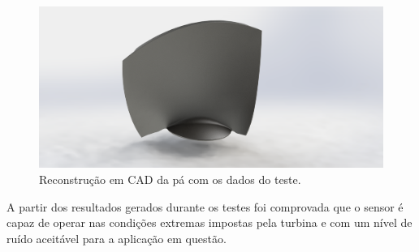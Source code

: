 \begin{figure}[h!]
\centering
	\includegraphics[width=0.9\columnwidth]{figs/3dsensors/Pa_Real_Render_04}
	\caption{Reconstrução em CAD da pá com os dados do teste.}
	\label{fig::turbina_cad}
\end{figure}

A partir dos resultados gerados durante os testes foi comprovada que o sensor é
capaz de operar nas condições extremas impostas pela turbina e com um nível de
ruído aceitável para a aplicação em questão. 